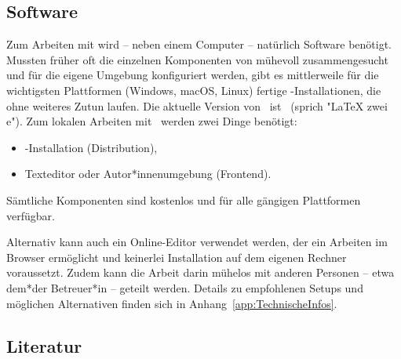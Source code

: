 \subsection{Software}
\label{sec:Software}

Zum Arbeiten mit \latex wird -- neben einem Computer -- natürlich Software
benötigt. Mussten früher oft die einzelnen Komponenten von \latex mühevoll
zusammengesucht und für die eigene Umgebung konfiguriert werden, gibt es
mittlerweile für die wichtigsten Plattformen (Windows, macOS, Linux) fertige
\latex-Installationen, die ohne weiteres Zutun laufen. Die aktuelle Version von
\latex\ ist \LaTeXe\ (sprich "LaTeX zwei e"). Zum lokalen Arbeiten mit \latex\
werden zwei Dinge benötigt:
%
\begin{itemize}
    \item \latex-Installation (Distribution),
    \item Texteditor oder Autor*innenumgebung (Frontend).
\end{itemize}
%
Sämtliche Komponenten sind kostenlos und für alle gängigen Plattformen
verfügbar.

Alternativ kann auch ein Online-Editor verwendet werden, der ein Arbeiten im
Browser ermöglicht und keinerlei Installation auf dem eigenen Rechner
voraussetzt. Zudem kann die Arbeit darin mühelos mit anderen Personen -- etwa
dem*der Betreuer*in -- geteilt werden. Details zu empfohlenen Setups und
möglichen Alternativen finden sich in Anhang~\ref{app:TechnischeInfos}.

\subsection{Literatur}
\label{sec:literatur}

